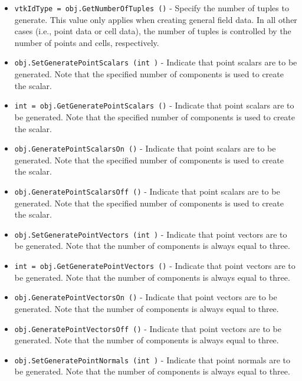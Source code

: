 \begin{itemize}
\item  \verb|vtkIdType = obj.GetNumberOfTuples ()| -  Specify the number of tuples to generate. This value only applies when creating
 general field data. In all other cases (i.e., point data or cell data), the number
 of tuples is controlled by the number of points and cells, respectively.

\item  \verb|obj.SetGeneratePointScalars (int )| -  Indicate that point scalars are to be generated. Note that the specified
 number of components is used to create the scalar.

\item  \verb|int = obj.GetGeneratePointScalars ()| -  Indicate that point scalars are to be generated. Note that the specified
 number of components is used to create the scalar.

\item  \verb|obj.GeneratePointScalarsOn ()| -  Indicate that point scalars are to be generated. Note that the specified
 number of components is used to create the scalar.

\item  \verb|obj.GeneratePointScalarsOff ()| -  Indicate that point scalars are to be generated. Note that the specified
 number of components is used to create the scalar.

\item  \verb|obj.SetGeneratePointVectors (int )| -  Indicate that point vectors are to be generated. Note that the 
 number of components is always equal to three.

\item  \verb|int = obj.GetGeneratePointVectors ()| -  Indicate that point vectors are to be generated. Note that the 
 number of components is always equal to three.

\item  \verb|obj.GeneratePointVectorsOn ()| -  Indicate that point vectors are to be generated. Note that the 
 number of components is always equal to three.

\item  \verb|obj.GeneratePointVectorsOff ()| -  Indicate that point vectors are to be generated. Note that the 
 number of components is always equal to three.

\item  \verb|obj.SetGeneratePointNormals (int )| -  Indicate that point normals are to be generated. Note that the
 number of components is always equal to three.


\end{itemize}
